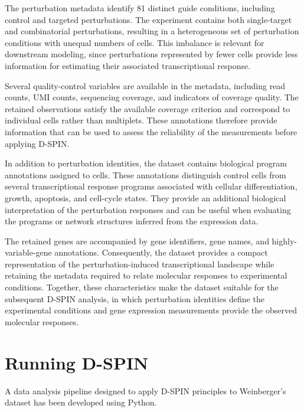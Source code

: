 \documentclass[11pt,a4paper]{article}
\begin{document}
The perturbation metadata identify 81 distinct guide conditions, including control and targeted perturbations. The experiment contains both single-target and combinatorial perturbations, resulting in a heterogeneous set of perturbation conditions with unequal numbers of cells. This imbalance is relevant for downstream modeling, since perturbations represented by fewer cells provide less information for estimating their associated transcriptional response.

Several quality-control variables are available in the metadata, including read counts, UMI counts, sequencing coverage, and indicators of coverage quality. The retained observations satisfy the available coverage criterion and correspond to individual cells rather than multiplets. These annotations therefore provide information that can be used to assess the reliability of the measurements before applying D-SPIN.

In addition to perturbation identities, the dataset contains biological program annotations assigned to cells. These annotations distinguish control cells from several transcriptional response programs associated with cellular differentiation, growth, apoptosis, and cell-cycle states. They provide an additional biological interpretation of the perturbation responses and can be useful when evaluating the programs or network structures inferred from the expression data.

The retained genes are accompanied by gene identifiers, gene names, and highly-variable-gene annotations. Consequently, the dataset provides a compact representation of the perturbation-induced transcriptional landscape while retaining the metadata required to relate molecular responses to experimental conditions. Together, these characteristics make the dataset suitable for the subsequent D-SPIN analysis, in which perturbation identities define the experimental conditions and gene expression measurements provide the observed molecular responses.


\newpage

\section{Running D-SPIN}

A data analysis pipeline designed to apply D-SPIN principles to Weinberger's dataset has been developed using Python. 
\end{document}
